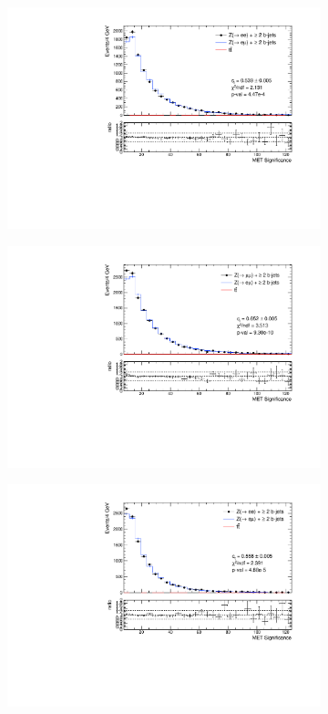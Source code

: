 \documentclass{article}
\begin{document}
\begin{figure}
\caption{MET Significance analysis with 4 GeV bins}
\begin{center}
	\begin{subfigure}[b]{0.45\textwidth}
		\includegraphics[width=\linewidth]{Zee_METsig_2016.pdf}
	\end{subfigure}
	\begin{subfigure}[b]{0.45\textwidth}
		\includegraphics[width=\linewidth]{Zmm_METsig_2016.pdf}
	\end{subfigure}
	\begin{subfigure}[b]{0.45\textwidth}
		\includegraphics[width=\linewidth]{Zee_METsig_2017.pdf}

\end{subfigure}
\end{center}
\end{figure}
\end{document}
